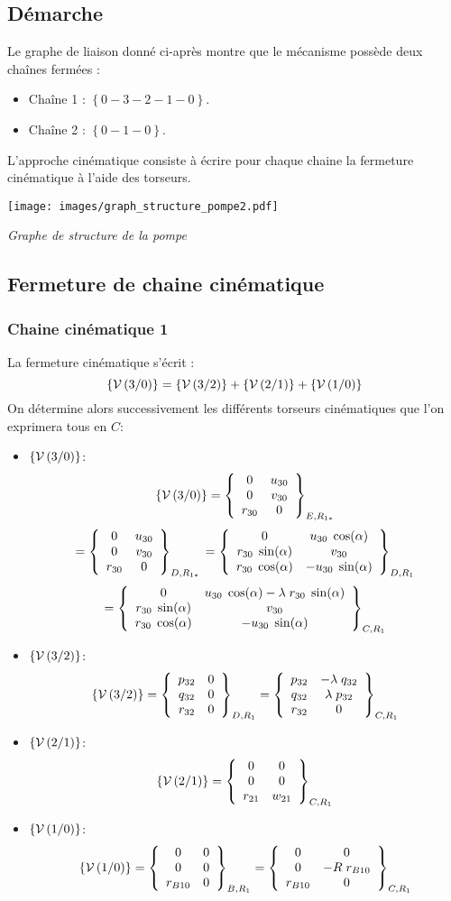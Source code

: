 \documentclass[10pt,fleqn]{article} %
\begin{document}
\subsection{Démarche}
Le graphe de liaison donné ci-après montre que le mécanisme possède deux chaînes fermées :
\begin{itemize}
\item Chaîne 1 : $\left\{0-3-2-1-0\right\}$.
\item Chaîne 2 : $\left\{0-1-0\right\}$.
\end{itemize}
L'approche cinématique consiste à écrire pour chaque chaine la fermeture cinématique à l'aide des torseurs.




\begin{center}
\texttt{[image: images/graph\_structure\_pompe2.pdf]}

\textit{Graphe de structure de la pompe \label{fig:graphe_structure_pompe2}}
\end{center}


\subsection{Fermeture de chaine cinématique}
\subsubsection{Chaine cinématique 1}

La fermeture cinématique s'écrit :
$$
\torseurcin{V}{3}{0} = \torseurcin{V}{3}{2}
+\torseurcin{V}{2}{1}
+\torseurcin{V}{1}{0}
$$
		On détermine alors successivement les différents torseurs cinématiques que l'on exprimera tous en $C$:

		\begin{itemize}
\item \textbf{$\torseurcin{V}{3}{0}$}:\\
$$
\torseurcin{V}{3}{0}	
=	\torseurcol{0}{0}{r_{30}}{u_{30}}{v_{30}}{0}{E,R_{1*}}
$$
$$
=	\torseurcol{0}{0}{{r}_{30}}{u_{30}}{v_{30}}{0}{D,R_{1*}}\\
=	\torseurcol{0}{r_{30}\;\sin(\alpha)}{r_{30}\;\cos(\alpha)}{u_{30}\;\cos(\alpha)}{v_{30}}{-u_{30}\;\sin(\alpha)}{D,R_{1}}
$$
$$
=\torseurcol{0}{r_{30}\;\sin(\alpha)}{r_{30}\;\cos(\alpha)}{u_{30}\;\cos(\alpha)-\lambda\;r_{30}\;\sin(\alpha)}{v_{30}}{-u_{30}\;\sin(\alpha)}{C,R_{1}}
$$
\item \textbf{$\torseurcin{V}{3}{2}$}:\\
$$
\torseurcin{V}{3}{2}	
=	\torseurcol{p_{32}}{q_{32}}{r_{32}}{0}{0}{0}{D,R_{1}}
=	\torseurcol{p_{32}}{q_{32}}{r_{32}}{-\lambda\;q_{32}}{\lambda\;p_{32}}{0}{C,R_{1}}
$$
\item \textbf{$\torseurcin{V}{2}{1}$}:\\
$$
\torseurcin{V}{2}{1}	
=	\torseurcol{0}{0}{r_{21}}{0}{0}{w_{21}}{C,R_{1}}
$$
\item \textbf{$\torseurcin{V}{1}{0}$}:\\
$$
\torseurcin{V}{1}{0}	
=	\torseurcol{0}{0}{r_{B10}}{0}{0}{0}{B,R_{1}}
=	\torseurcol{0}{0}{r_{B10}}{0}{-R\;r_{B10}}{0}{C,R_{1}}
$$
\end{itemize}
		
\end{document}

